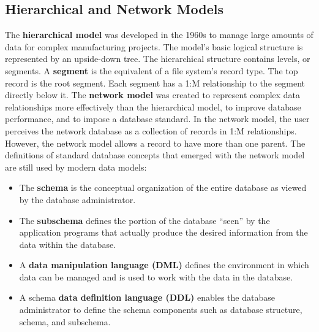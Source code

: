 \documentclass[a4paper, 12pt, titlepage]{report}
\begin{document}
\subsection{Hierarchical and Network Models}
The \textbf{hierarchical model} was developed in the 1960s to manage large amounts of data for complex manufacturing projects. The model’s basic logical structure is represented by an upside-down tree. The hierarchical structure contains levels, or segments. A \textbf{segment} is the equivalent of a file system’s record type. The top record is the root segment. Each segment has a 1:M relationship to the segment directly below it.
The \textbf{network model} was created to represent complex data relationships more effectively than the hierarchical model, to improve database performance, and to impose a database standard. In the network model, the user perceives the network database as a
collection of records in 1:M relationships. However, the network model allows a record to have more than one parent. The definitions of standard database concepts that emerged with the network model are still used by modern data models:
\begin{itemize}
\item The \textbf{schema} is the conceptual organization of the entire database as viewed by the database administrator.
\item The \textbf{subschema} defines the portion of the database “seen” by the application programs that actually produce the desired information from the data within the database.
\item A \textbf{data manipulation language (DML)} defines the environment in which data can be managed and is used to work with the data in the database.
\item A schema \textbf{data definition language (DDL)} enables the database administrator to define the schema components such as database
structure, schema, and subschema.
\end{itemize}
\end{document}
